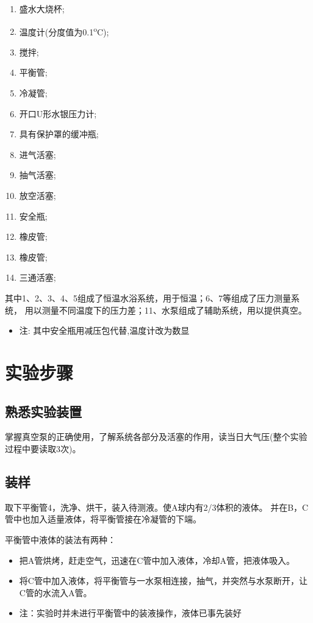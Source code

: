 \documentclass[11pt]{report}
\begin{document}
\begin{enumerate}
\item 盛水大烧杯;
\item 温度计(分度值为0.1\textsuperscript{o}C);
\item 搅拌;
\item 平衡管;
\item 冷凝管;
\item 开口U形水银压力计;
\item 具有保护罩的缓冲瓶;
\item 进气活塞;
\item 抽气活塞;
\item 放空活塞;
\item 安全瓶;
\item 橡皮管;
\item 橡皮管;
\item 三通活塞;
\end{enumerate}

其中1、2、3、4、5组成了恒温水浴系统，用于恒温；6、7等组成了压力测量系统，
用以测量不同温度下的压力差；11、水泵组成了辅助系统，用以提供真空。

\begin{itemize}
\item 注: 其中安全瓶用减压包代替,温度计改为数显
\end{itemize}

\chapter{实验步骤}
\label{sec:org8059aa3}
\section{熟悉实验装置}
\label{sec:org0425331}
掌握真空泵的正确使用，了解系统各部分及活塞的作用，读当日大气压(整个实验过程中要读取3次)。
\section{装样}
\label{sec:org24a698b}
取下平衡管4，洗净、烘干，装入待测液。使A球内有2/3体积的液体。
并在B，C管中也加入适量液体，将平衡管接在冷凝管的下端。

平衡管中液体的装法有两种：
\begin{itemize}
\item 把A管烘烤，赶走空气，迅速在C管中加入液体，冷却A管，把液体吸入。
\item 将C管中加入液体，将平衡管与一水泵相连接，抽气，并突然与水泵断开，让C管的水流入A管。

\item 注：实验时并未进行平衡管中的装液操作，液体已事先装好
\end{itemize}
\end{document}
